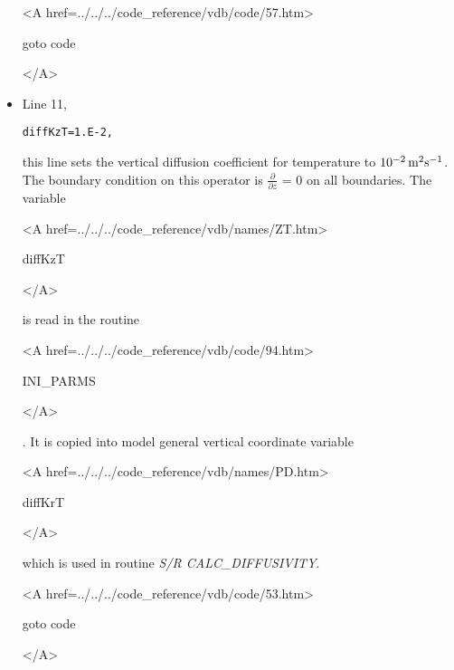 \begin{itemize}
{\bf
\begin{rawhtml} <A href=../../../code_reference/vdb/code/57.htm> \end{rawhtml}
goto code
\begin{rawhtml} </A>\end{rawhtml}
}

\item Line 11,
\begin{verbatim}
diffKzT=1.E-2,
\end{verbatim}
this line sets the vertical diffusion coefficient for temperature
to $10^{-2}\,{\rm m^{2}s^{-1}}$. The boundary condition on this
operator is $\frac{\partial}{\partial z}$ = 0 on all boundaries.
The variable
{\bf
\begin{rawhtml} <A href=../../../code_reference/vdb/names/ZT.htm> \end{rawhtml}
diffKzT
\begin{rawhtml} </A>\end{rawhtml}
}
is read in the routine
{\it
\begin{rawhtml} <A href=../../../code_reference/vdb/code/94.htm> \end{rawhtml}
INI\_PARMS
\begin{rawhtml} </A>\end{rawhtml}
}.
It is copied into model general vertical coordinate variable
{\bf
\begin{rawhtml} <A href=../../../code_reference/vdb/names/PD.htm> \end{rawhtml}
diffKrT
\begin{rawhtml} </A>\end{rawhtml}
} which is used in routine {\it S/R CALC\_DIFFUSIVITY}.

{\bf
\begin{rawhtml} <A href=../../../code_reference/vdb/code/53.htm> \end{rawhtml}
goto code
\begin{rawhtml} </A>\end{rawhtml}
}




\end{itemize}
